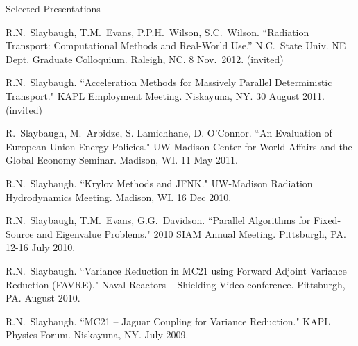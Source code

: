 \documentclass{resume2} %
\begin{document}
\begin{rSection}{Selected Presentations}

\begin{bibsection}
\item R.N.\ Slaybaugh, T.M.\ Evans, P.P.H.\ Wilson, S.C.\ Wilson. ``Radiation Transport: Computational Methods and Real-World Use.'' N.C.\ State Univ. NE Dept. Graduate Colloquium. Raleigh, NC. 8 Nov.\ 2012. (invited)

\item R.N.\ Slaybaugh. ``Acceleration Methods for Massively Parallel Deterministic Transport." KAPL Employment Meeting. Niskayuna, NY. 30 August 2011. (invited)

\item R.\ Slaybaugh, M.\ Arbidze, S. Lamichhane, D. O’Connor. ``An Evaluation of European Union Energy Policies." UW-Madison Center for World Affairs and the Global Economy Seminar. Madison, WI. 11 May 2011.

\item R.N.\ Slaybaugh. ``Krylov Methods and JFNK." UW-Madison Radiation Hydrodynamics Meeting. Madison, WI. 16 Dec 2010.

\item R.N.\ Slaybaugh, T.M.\ Evans, G.G.\ Davidson. ``Parallel Algorithms for Fixed-Source and Eigenvalue Problems." 2010 SIAM Annual Meeting. Pittsburgh, PA. 12-16 July 2010.

\item R.N.\ Slaybaugh. ``Variance Reduction in MC21 using Forward Adjoint Variance Reduction (FAVRE)." Naval Reactors – Shielding Video-conference. Pittsburgh, PA. August 2010.

\item R.N.\ Slaybaugh. ``MC21 – Jaguar Coupling for Variance Reduction." KAPL Physics Forum. Niskayuna, NY. July 2009.

\end{bibsection}

\end{rSection}
\end{document}
